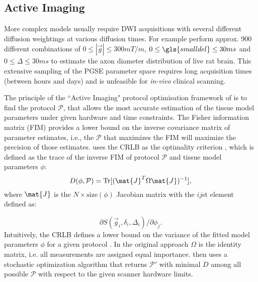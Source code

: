 \subsection{Active Imaging}
\label{sec:protocol_optimisation}
More complex models usually require  {\gls{DWI}}  acquisitions with several different diffusion weightings at various diffusion times. For example \citet{Barazany:2009} perform approx. 900 different combinations of $0\le|\vec{g}|\le 300mT/m$, $0\le {\gls{smalldel}} \le 30ms$ and $0\le \Delta \le 30ms$ to estimate the axon diameter distribution of live rat brain. This extensive sampling of the \gls{PGSE} parameter space requires long acquisition times (between hours and days) and is unfeasible for \emph{in-vivo} clinical scanning. 

The principle of the ``Active Imaging" protocol optimisation framework of \cite{Alexander:2008} is to find the protocol $\mathcal{P}$, that allows the most accurate estimation of the tissue model parameters under given hardware and time constraints. The Fisher information matrix (FIM) provides a lower bound on the inverse covariance matrix of parameter estimates, i.e., the $\mathcal{P}$ that maximizes the FIM will maximize the precision of those estimates. \citeauthor{Alexander:2008} uses the \gls{CRLB} as the optimality criterion \citep{OBrien:2003}, which is defined as the trace of the inverse FIM of protocol $\mathcal{P}$ and tissue model parameters $\phi$:
\begin{equation}
	D(\phi,\mathcal{P})=\mbox{Tr}[(\mat{J}^T\Omega\mat{J})^{-1}], 
	\label{eq-optimality}
\end{equation}
where $\mat{J}$ is the $N\times \mbox{size}(\phi)$ Jacobian matrix with the $ij$st element defined as:

\begin{equation}
	\partial S(\vec{g}_i,\delta_i,\Delta_i) / \partial \phi_j.
\end{equation}
Intuitively, the \gls{CRLB} defines a lower bound on the variance of the fitted model parameters $\phi$ for a given protocol \prot. In the original approach $\Omega$ is the identity matrix, i.e. all measurements are assigned equal importance. \citet{Alexander:2008} then uses a stochastic optimization algorithm \citep{Zelinka:2010} that returns $\mathcal{P}'$ with minimal $D$ among all possible $\mathcal{P}$ with respect to the given scanner hardware limits.

